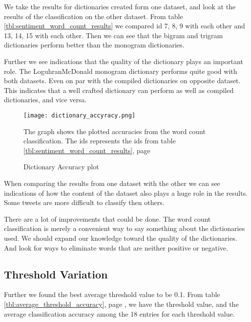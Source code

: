 We take the results for dictionaries created form one dataset,
and look at the results of the classification on the other dataset. From table
\ref{tbl:sentiment_word_count_results} we compared id
7, 8, 9 with each other and 13, 14, 15 with each other. Then we can see that
the bigram and trigram dictionaries perform better than the monogram
dictionaries.

Further we see indications that the quality of the dictionary plays an
important role. The LoguhranMcDonald monogram dictionary performs quite good
with both datasets. Even on par with the compiled dictionaries on opposite
dataset. This indicates that a well crafted dictionary can perform as well
as compiled dictionaries, and vice versa.

\begin{figure}[htb]
    \centering
    \texttt{[image: dictionary\_accyracy.png]}
    \label{fig:dictionary_accyracy}
    \caption{Dictionary Accuracy plot}
The graph shows the plotted accuracies from the word count
classification. The ids represents the ids from table
\ref{tbl:sentiment_word_count_results}, page
\pageref{tbl:sentiment_word_count_results}
\end{figure}

When comparing the results from one dataset with the other we can see indications
of how the content of the dataset also plays a huge role in the results. Some
tweets are more difficult to classify then others.

There are a lot of improvements that could be done.
The word count classification is merely a convenient way to say something about
the dictionaries used. We should expand our knowledge toward the quality of the
dictionaries. And look for ways to eliminate words that are neither positive or
negative. 

\subsection{Threshold Variation}\label{results:threshold}
Further we found the best average threshold value to be 0.1.
From table \ref{tbl:average_threshold_accuracy}, page \pageref{tbl:average_threshold_accuracy}, we have the threshold value, and the average
classification accuracy among the 18 entries for each threshold value.


